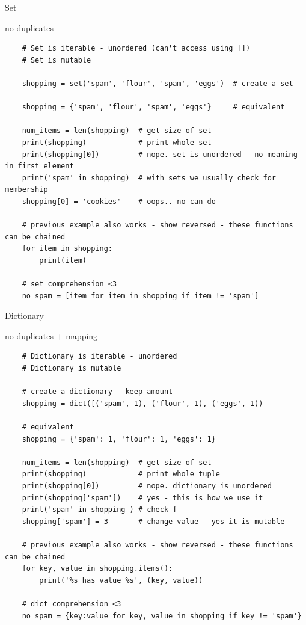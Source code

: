 \documentclass{bredelebeamer}
\begin{document}
\begin{frame}[fragile]{Set}
  \begin{exampleblock}{no duplicates}
    \begin{lstlisting}
    # Set is iterable - unordered (can't access using [])
    # Set is mutable
    
    shopping = set('spam', 'flour', 'spam', 'eggs')  # create a set
    
    shopping = {'spam', 'flour', 'spam', 'eggs'}     # equivalent
    
    num_items = len(shopping)  # get size of set
    print(shopping)            # print whole set
    print(shopping[0])         # nope. set is unordered - no meaning in first element
    print('spam' in shopping)  # with sets we usually check for membership
    shopping[0] = 'cookies'    # oops.. no can do
    
    # previous example also works - show reversed - these functions can be chained
    for item in shopping:
        print(item)
        
    # set comprehension <3
    no_spam = [item for item in shopping if item != 'spam']
    \end{lstlisting}
  \end{exampleblock}
\end{frame}

\begin{frame}[fragile]{Dictionary}
  \begin{exampleblock}{no duplicates + mapping}
    \begin{lstlisting}
    # Dictionary is iterable - unordered
    # Dictionary is mutable
    
    # create a dictionary - keep amount
    shopping = dict([('spam', 1), ('flour', 1), ('eggs', 1))
    
    # equivalent
    shopping = {'spam': 1, 'flour': 1, 'eggs': 1}
    
    num_items = len(shopping)  # get size of set
    print(shopping)            # print whole tuple
    print(shopping[0])         # nope. dictionary is unordered
    print(shopping['spam'])    # yes - this is how we use it
    print('spam' in shopping ) # check f
    shopping['spam'] = 3       # change value - yes it is mutable
    
    # previous example also works - show reversed - these functions can be chained
    for key, value in shopping.items():
        print('%s has value %s', (key, value))
        
    # dict comprehension <3
    no_spam = {key:value for key, value in shopping if key != 'spam'}
    \end{lstlisting}
  \end{exampleblock}
\end{frame}
\end{document}
